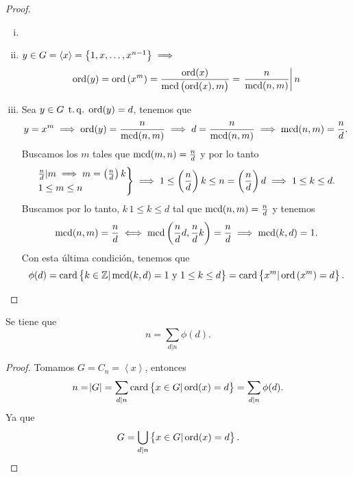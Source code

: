 \begin{proof}
    \begin{enumerate}[i)]
        \item[]
        \item $y \in G = \left< x \right> = \left\{1, x, \dots, x^{n-1}\right\} \implies$
                \[
                    \operatorname{ord}(y) = \operatorname{ord}\left( x^m \right) = \frac{\operatorname{ord}(x)}{\operatorname{mcd}\left(\operatorname{ord}(x), m \right)} =
                    \left.\frac{n}{\operatorname{mcd}(n, m)} \right\vert n
                \]
        \item Sea $y \in G \operatorname{\;t.q.\;} \operatorname{ord}(y) = d$, tenemos que
                \[
                    y = x^m \implies \operatorname{ord}(y) = \frac{n}{\operatorname{mcd}(n, m)} \implies d = \frac{n}{\operatorname{mcd}(n, m)} 
                    \implies \operatorname{mcd}(n, m) = \frac{n}{d}.
                \]
                Buscamos los $m$ tales que $\operatorname{mcd}(m, n) = \frac{n}{d}$ y por lo tanto
                \[
                    \begin{rcases}
                        \frac{n}{d} \vert m \implies m = \left( \frac{n}{d} \right)k \\
                        1 \leq m \leq n
                    \end{rcases}
                    \implies 1 \leq \left( \frac{n}{d} \right)k \leq n = \left( \frac{n}{d} \right)d
                    \implies 1 \leq k \leq d.
                \]
                Buscamos por lo tanto, $k\, 1 \leq k \leq d$ tal que $\operatorname{mcd}(n, m) = \frac{n}{d}$ y tenemos
                \[
                    \operatorname{mcd}(n, m) = \frac{n}{d} \iff \operatorname{mcd}\left( \frac{n}{d}d, \frac{n}{d}k \right) = \frac{n}{d}
                    \implies \operatorname{mcd}(k, d) = 1.
                \]
                Con esta última condición, tenemos que
                \[
                    \phi(d) = \operatorname{card} \left\{ k \in \mathbb{Z} \vert \operatorname{mcd}(k, d) = 1 \text{ y } 1 \leq k \leq d\right\}
                    = \operatorname{card} \left\{ x^m \vert \operatorname{ord}\left( x^m \right) = d\right\}.
                \]
    \end{enumerate}
\end{proof}

\begin{col}
    Se tiene que
    \[
        n = \sum_{d \vert n} \phi(d).
    \]
\end{col}

\begin{proof}
    Tomamos $G = C_n = \left< x \right>$, entonces
    \[
        n = \abs{G} = \sum_{d \vert n} \operatorname{card} \left\{ x \in G \vert \operatorname{ord}(x) =d \right\} = \sum_{d \vert n} \phi(d).
    \]
    Ya que
    \[
        G = \bigcup_{d \vert n} \left\{x \in G \vert \operatorname{ord}(x) = d\right\}.
    \]
\end{proof}
